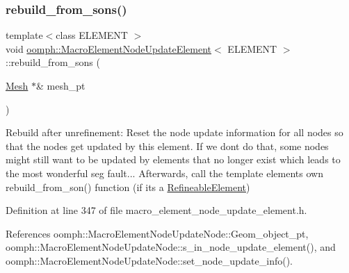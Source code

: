 \subsubsection{\texorpdfstring{rebuild\+\_\+from\+\_\+sons()}{rebuild\_from\_sons()}}
{\footnotesize\ttfamily template$<$class E\+L\+E\+M\+E\+NT $>$ \\
void \hyperlink{classoomph_1_1MacroElementNodeUpdateElement}{oomph\+::\+Macro\+Element\+Node\+Update\+Element}$<$ E\+L\+E\+M\+E\+NT $>$\+::rebuild\+\_\+from\+\_\+sons (\begin{DoxyParamCaption}\item[{\hyperlink{classoomph_1_1Mesh}{Mesh} $\ast$\&}]{mesh\+\_\+pt }\end{DoxyParamCaption})\hspace{0.3cm}{\ttfamily [inline]}}



Rebuild after unrefinement\+: Reset the node update information for all nodes so that the nodes get updated by this element. If we don\textquotesingle{}t do that, some nodes might still want to be updated by elements that no longer exist which leads to the most wonderful seg fault... Afterwards, call the template element\textquotesingle{}s own rebuild\+\_\+from\+\_\+son() function (if it\textquotesingle{}s a \hyperlink{classoomph_1_1RefineableElement}{Refineable\+Element}) 



Definition at line 347 of file macro\+\_\+element\+\_\+node\+\_\+update\+\_\+element.\+h.



References oomph\+::\+Macro\+Element\+Node\+Update\+Node\+::\+Geom\+\_\+object\+\_\+pt, oomph\+::\+Macro\+Element\+Node\+Update\+Node\+::s\+\_\+in\+\_\+node\+\_\+update\+\_\+element(), and oomph\+::\+Macro\+Element\+Node\+Update\+Node\+::set\+\_\+node\+\_\+update\+\_\+info().

\mbox{\label{classoomph_1_1MacroElementNodeUpdateElement_a229ef724fbfd1917159508bde5207fb5}} 
